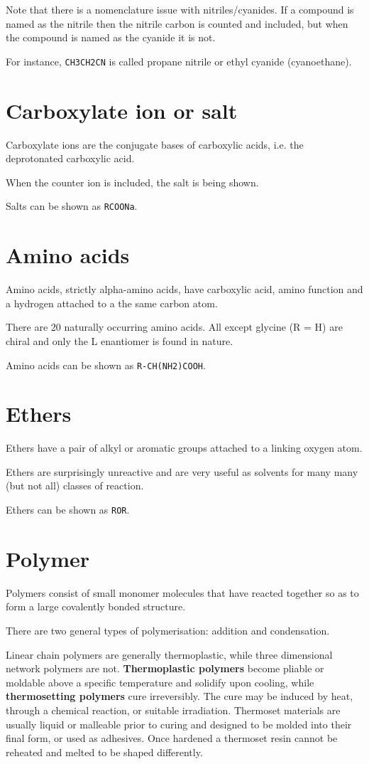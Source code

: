 \documentclass[12pt, oneside]{book}
\begin{document}
Note that there is a nomenclature issue with nitriles/cyanides. If a compound is
named as the nitrile then the nitrile carbon is counted and included, but when
the compound is named as the cyanide it is not.

For instance, \texttt{CH3CH2CN} is called propane nitrile or ethyl cyanide
(cyanoethane).

\section{Carboxylate ion or salt}
Carboxylate ions are the conjugate bases of carboxylic acids, i.e. the
deprotonated carboxylic acid.

When the counter ion is included, the salt is being shown.

Salts can be shown as \texttt{RCOONa}.

\section{Amino acids}
Amino acids, strictly alpha-amino acids, have carboxylic acid, amino function
and a hydrogen attached to a the same carbon atom.

There are 20 naturally occurring amino acids. All except glycine (R = H) are
chiral and only the L enantiomer is found in nature.

Amino acids can be shown as \texttt{R-CH(NH2)COOH}.

\section{Ethers}
Ethers have a pair of alkyl or aromatic groups attached to a linking oxygen
atom.

Ethers are surprisingly unreactive and are very useful as solvents for many many
(but not all) classes of reaction.

Ethers can be shown as \texttt{ROR}.

\section{Polymer}
Polymers consist of small monomer molecules that have reacted together so as to
form a large covalently bonded structure.

There are two general types of polymerisation: addition and condensation.

Linear chain polymers are generally thermoplastic, while three dimensional
network polymers are not. \textbf{Thermoplastic polymers} become pliable or
moldable above a specific temperature and solidify upon cooling, while
\textbf{thermosetting polymers} cure irreversibly. The cure may be induced by
heat, through a chemical reaction, or suitable irradiation. Thermoset materials
are usually liquid or malleable prior to curing and designed to be molded into
their final form, or used as adhesives. Once hardened a thermoset resin cannot
be reheated and melted to be shaped differently.
\end{document}
